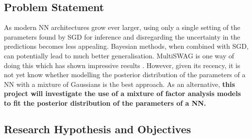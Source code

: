 \documentclass[a4paper,11pt]{article}
\begin{document}

\subsection{Problem Statement}

As modern NN architectures grow ever larger, using only a single setting of the parameters found by SGD for inference and disregarding the uncertainty in the predictions becomes less appealing. Bayesian methods, when combined with SGD, can potentially lead to much better generalisation. MultiSWAG is one way of doing this which has shown impressive results \cite{izmailov2020}. However, given its recency, it is not yet know whether modelling the posterior distribution of the parameters of a NN with a mixture of Gaussians is the best approach. As an alternative, \textbf{this project will investigate the use of a mixture of factor analysis  \cite{barber2007} models to fit the posterior distribution of the parameters of a NN.}



\subsection{Research Hypothesis and Objectives}\label{sec:hypothesis}
\end{document}
